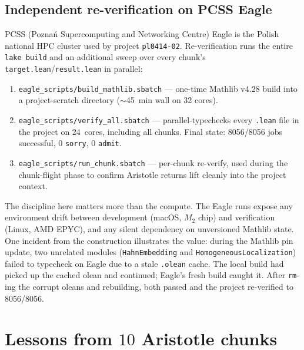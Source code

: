 \documentclass[11pt,a4paper]{article}
\theoremstyle{plain}
\theoremstyle{definition}
\begin{document}
\subsection*{Independent re-verification on PCSS Eagle}

PCSS (Poznań Supercomputing and Networking Centre) Eagle is the
Polish national HPC cluster used by project \texttt{pl0414-02}.
Re-verification runs the entire \texttt{lake build} and an additional
sweep over every chunk's \texttt{target.lean}/\texttt{result.lean} in
parallel:

\begin{enumerate}[topsep=2pt, itemsep=2pt]
\item \texttt{eagle\_scripts/build\_mathlib.sbatch} --- one-time
  Mathlib v4.28 build into a project-scratch directory
  ($\sim$45~min wall on 32 cores).
\item \texttt{eagle\_scripts/verify\_all.sbatch} ---
  parallel-typechecks every \texttt{.lean} file in the project on
  24~cores, including all chunks. Final state: 8056/8056 jobs
  successful, 0 \texttt{sorry}, 0 \texttt{admit}.
\item \texttt{eagle\_scripts/run\_chunk.sbatch} --- per-chunk
  re-verify, used during the chunk-flight phase to confirm Aristotle
  returns lift cleanly into the project context.
\end{enumerate}

The discipline here matters more than the compute. The Eagle runs
expose any environment drift between development (macOS, $M_2$ chip)
and verification (Linux, AMD EPYC), and any silent dependency on
unversioned Mathlib state. One incident from the construction
illustrates the value: during the Mathlib pin update, two unrelated
modules (\texttt{HahnEmbedding} and \texttt{HomogeneousLocalization})
failed to typecheck on Eagle due to a stale \texttt{.olean} cache.
The local build had picked up the cached olean and continued; Eagle's
fresh build caught it. After \texttt{rm}-ing the corrupt oleans and
rebuilding, both passed and the project re-verified to 8056/8056.

\section{\texorpdfstring{Lessons from $10$}{Lessons from 10} Aristotle chunks}
\label{sec:aristotle-lessons}
\end{document}
